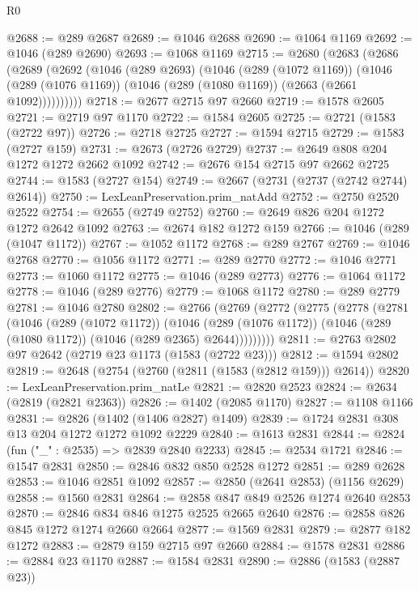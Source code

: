 \begin{lexlean}{R0}
\begin{coremodule}
@2688 := @289 @2687
@2689 := @1046 @2688
@2690 := @1064 @1169
@2692 := @1046 (@289 @2690)
@2693 := @1068 @1169
@2715 := @2680
    (@2683
      (@2686
        (@2689
          (@2692
            (@1046
              (@289 @2693)
              (@1046
                (@289 (@1072 @1169))
                (@1046
                  (@289 (@1076 @1169))
                  (@1046 (@289 (@1080 @1169)) (@2663 (@2661 @1092))))))))))
@2718 := @2677 @2715 @97 @2660
@2719 := @1578 @2605
@2721 := @2719 @97 @1170
@2722 := @1584 @2605
@2725 := @2721 (@1583 (@2722 @97))
@2726 := @2718 @2725
@2727 := @1594 @2715
@2729 := @1583 (@2727 @159)
@2731 := @2673 (@2726 @2729)
@2737 := @2649 @808 @204 @1272 @1272 @2662 @1092
@2742 := @2676 @154 @2715 @97 @2662 @2725
@2744 := @1583 (@2727 @154)
@2749 := @2667 (@2731 (@2737 (@2742 @2744) @2614))
@2750 := LexLeanPreservation.prim_natAdd
@2752 := @2750 @2520 @2522
@2754 := @2655 (@2749 @2752)
@2760 := @2649 @826 @204 @1272 @1272 @2642 @1092
@2763 := @2674 @182 @1272 @159
@2766 := @1046 (@289 (@1047 @1172))
@2767 := @1052 @1172
@2768 := @289 @2767
@2769 := @1046 @2768
@2770 := @1056 @1172
@2771 := @289 @2770
@2772 := @1046 @2771
@2773 := @1060 @1172
@2775 := @1046 (@289 @2773)
@2776 := @1064 @1172
@2778 := @1046 (@289 @2776)
@2779 := @1068 @1172
@2780 := @289 @2779
@2781 := @1046 @2780
@2802 := @2766
    (@2769
      (@2772
        (@2775
          (@2778
            (@2781
              (@1046
                (@289 (@1072 @1172))
                (@1046
                  (@289 (@1076 @1172))
                  (@1046 (@289 (@1080 @1172)) (@1046 (@289 @2365) @2644)))))))))
@2811 := @2763 @2802 @97 @2642 (@2719 @23 @1173 (@1583 (@2722 @23)))
@2812 := @1594 @2802
@2819 := @2648 (@2754 (@2760 (@2811 (@1583 (@2812 @159))) @2614))
@2820 := LexLeanPreservation.prim_natLe
@2821 := @2820 @2523
@2824 := @2634 (@2819 (@2821 @2363))
@2826 := @1402 (@2085 @1170)
@2827 := @1108 @1166
@2831 := @2826 (@1402 (@1406 @2827) @1409)
@2839 := @1724 @2831 @308 @13 @204 @1272 @1272 @1092 @2229
@2840 := @1613 @2831
@2844 := @2824 (fun ("_" : @2535) => @2839 @2840 @2233)
@2845 := @2534 @1721
@2846 := @1547 @2831
@2850 := @2846 @832 @850 @2528 @1272
@2851 := @289 @2628
@2853 := @1046 @2851 @1092
@2857 := @2850 (@2641 @2853) (@1156 @2629)
@2858 := @1560 @2831
@2864 := @2858 @847 @849 @2526 @1274 @2640 @2853
@2870 := @2846 @834 @846 @1275 @2525 @2665 @2640
@2876 := @2858 @826 @845 @1272 @1274 @2660 @2664
@2877 := @1569 @2831
@2879 := @2877 @182 @1272
@2883 := @2879 @159 @2715 @97 @2660
@2884 := @1578 @2831
@2886 := @2884 @23 @1170
@2887 := @1584 @2831
@2890 := @2886 (@1583 (@2887 @23))

\end{coremodule}
\end{lexlean}
